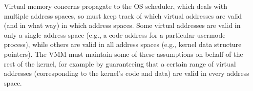 Virtual memory concerns propagate to the OS scheduler, which deals with multiple 
address spaces, so must keep track of which virtual addresses are valid (and in what way) in which address spaces. 
Some virtual addresses are valid in only a single address space (e.g., a code address for a particular usermode 
process), while others are valid in all address spaces (e.g., kernel data structure pointers). 
The VMM must maintain some of these assumptions on behalf of the rest of the kernel, for example by guaranteeing that 
a certain range of virtual addresses (corresponding to the kernel's code and data) are valid in every address space.


